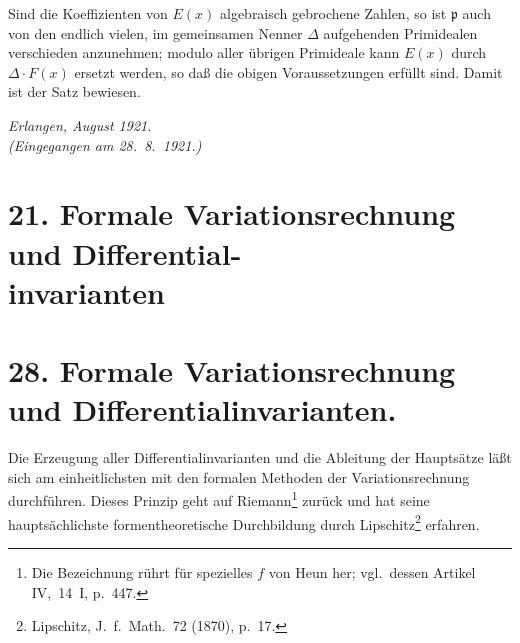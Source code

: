 \documentclass[fontsize=10pt,paper=a5,pagesize,headings=small]{scrbook}
\newcommand{\ideal}[1]{\mathfrak{#1}}
\theoremstyle{plain}
\begin{document}
Sind die Koeffizienten von $E(x)$ algebraisch gebrochene Zahlen, so ist
$\ideal{p}$ auch von den endlich vielen, im gemeinsamen Nenner $\Delta$ aufgehenden Primidealen
verschieden anzunehmen; modulo aller übrigen Primideale kann $E(x)$ durch
$\Delta \cdot F(x)$ ersetzt werden, so daß die obigen Voraussetzungen erfüllt sind.
Damit ist der Satz bewiesen.

\vfill
\begin{flushright}
\textit{Erlangen, August 1921.}\\[4pt]
\textit{(Eingegangen am 28.\ 8.\ 1921.)}
\end{flushright}

\newpage

\section*{21. Formale Variationsrechnung und Differential-\\invarianten\footnotemark[0]}


\setcounter{page}{419}
\section*{28. Formale Variationsrechnung und Differentialinvarianten.\footnotemark}
\setcounter{section}{28}


Die Erzeugung aller Differentialinvarianten und die Ableitung der
Hauptsätze läßt sich am einheitlichsten mit den formalen Methoden der
Variationsrechnung durchführen. Dieses Prinzip geht auf
Riemann\footnote{Die Bezeichnung rührt für spezielles $f$ von Heun her;
vgl.\ dessen Artikel IV,~14~I, p.~447.} zurück und hat seine hauptsächlichste
formentheoretische Durchbildung durch Lipschitz\footnote{Lipschitz, J.~f.\ Math.\ 72 (1870), p.~17.} erfahren.
\end{document}
